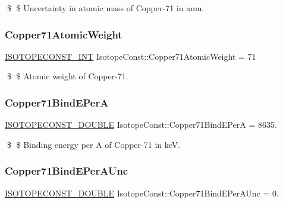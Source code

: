 \$ \$ Uncertainty in atomic mass of Copper-\/71 in amu. \mbox{\label{group___isotope_const-_copper-_cu71_ga88072a72cf9a3400d333e1c7ac76feb3}} 
\subsubsection{\texorpdfstring{Copper71\+Atomic\+Weight}{Copper71AtomicWeight}}
{\footnotesize\ttfamily \mbox{\hyperlink{group___isotope_const-_macros_ga5f18360b3e99483a35c32d789e62621c}{I\+S\+O\+T\+O\+P\+E\+C\+O\+N\+S\+T\+\_\+\+I\+NT}} Isotope\+Const\+::\+Copper71\+Atomic\+Weight = 71}

\$ \$ Atomic weight of Copper-\/71. \mbox{\label{group___isotope_const-_copper-_cu71_ga30aae1bab9c661a5347a45a0017d73f5}} 
\subsubsection{\texorpdfstring{Copper71\+Bind\+E\+PerA}{Copper71BindEPerA}}
{\footnotesize\ttfamily \mbox{\hyperlink{group___isotope_const-_macros_ga8f45a7272ce02c0b4c65c44636ed719a}{I\+S\+O\+T\+O\+P\+E\+C\+O\+N\+S\+T\+\_\+\+D\+O\+U\+B\+LE}} Isotope\+Const\+::\+Copper71\+Bind\+E\+PerA = 8635.}

\$ \$ Binding energy per A of Copper-\/71 in keV. \mbox{\label{group___isotope_const-_copper-_cu71_ga3a30201fa7e48c1704e01d9f7c0689e3}} 
\subsubsection{\texorpdfstring{Copper71\+Bind\+E\+Per\+A\+Unc}{Copper71BindEPerAUnc}}
{\footnotesize\ttfamily \mbox{\hyperlink{group___isotope_const-_macros_ga8f45a7272ce02c0b4c65c44636ed719a}{I\+S\+O\+T\+O\+P\+E\+C\+O\+N\+S\+T\+\_\+\+D\+O\+U\+B\+LE}} Isotope\+Const\+::\+Copper71\+Bind\+E\+Per\+A\+Unc = 0.}

